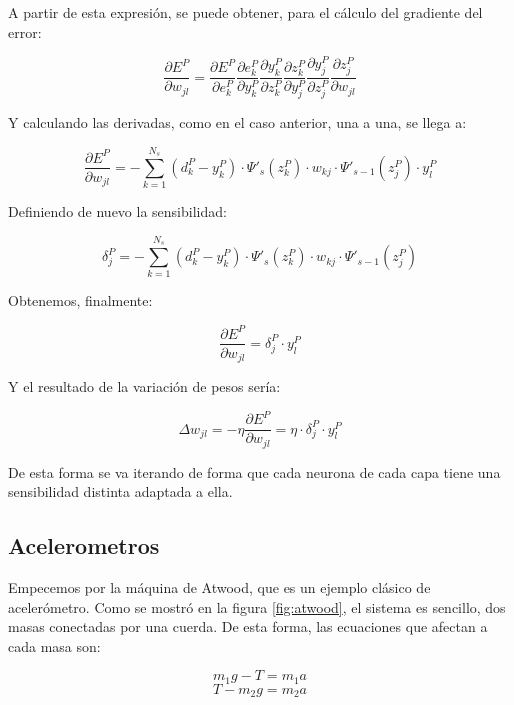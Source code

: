 \documentclass[12pt]{article}
\numberwithin{equation}{section}
\begin{document}
A partir de esta expresión, se puede obtener, para el cálculo del gradiente del error:

\begin{equation}
\frac{\partial E^P}{\partial w_{jl}} = \frac{\partial E^P}{\partial e_{k}^P} \frac{\partial e^P_k}{\partial y_{k}^P} \frac{\partial y^P_k}{\partial z_{k}^P} \frac{\partial z^P_k}{\partial y_j^P} \frac{\partial y^P_j}{\partial z_j^P} \frac{\partial z^P_j}{\partial w_{jl}}
\end{equation}

Y calculando las derivadas, como en el caso anterior, una a una, se llega a:

\begin{equation}
\frac{\partial E^P}{\partial w_{jl}} =-\sum _{k=1}^{N_s}(d_k^P-y_k^P) \cdot \Psi ' _s(z_k^P) \cdot w_{kj} \cdot \Psi '_{s-1}(z_j^P) \cdot y_l^P
\end{equation}

Definiendo de nuevo la sensibilidad:

\begin{equation}
\delta _j^P = -\sum _{k=1}^{N_s}(d_k^P-y_k^P) \cdot \Psi ' _s(z_k^P) \cdot w_{kj} \cdot \Psi '_{s-1}(z_j^P)
\end{equation}

Obtenemos, finalmente:

\begin{equation}
\frac{\partial E^P}{\partial w_{jl}} = \delta _j^P \cdot y_l^P
\end{equation}

Y el resultado de la variación de pesos sería: 

\begin{equation}
\Delta w_{jl} = -\eta \frac{\partial E^P}{\partial w_{jl}} = \eta \cdot \delta _j^P \cdot y_l^P
\end{equation}

De esta forma se va iterando de forma que cada neurona de cada capa tiene una sensibilidad distinta adaptada a ella.

\subsection{Acelerometros}

Empecemos por la máquina de Atwood, que es un ejemplo clásico de acelerómetro. Como se mostró en la figura \ref{fig:atwood}, el sistema es sencillo, dos masas conectadas por una cuerda. De esta forma, las ecuaciones que afectan a cada masa son:

\begin{equation}
m_1 g -T = m_1 a
\end{equation}
\begin{equation}
T - m_2 g = m_2 a
\end{equation}
\end{document}
